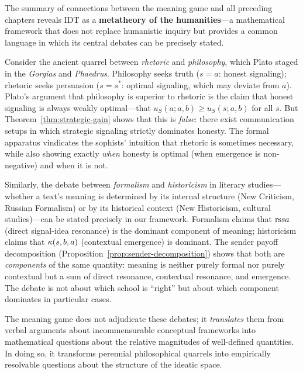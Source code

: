 \begin{interpretation}
\label{interp:ch14:summary_metatheory}
The summary of connections between the meaning game and all preceding
chapters reveals IDT as a \textbf{metatheory of the humanities}---a
mathematical framework that does not replace humanistic inquiry but provides
a common language in which its central debates can be precisely stated.

Consider the ancient quarrel between \emph{rhetoric} and \emph{philosophy},
which Plato staged in the \emph{Gorgias} and \emph{Phaedrus}.  Philosophy
seeks truth ($s = a$: honest signaling); rhetoric seeks persuasion
($s = s^*$: optimal signaling, which may deviate from $a$).  Plato's
argument that philosophy is superior to rhetoric is the claim that honest
signaling is always weakly optimal---that $u_S(a; a, b) \geq u_S(s; a, b)$
for all $s$.  But Theorem~\ref{thm:strategic-gain} shows that this is
\emph{false}: there exist communication setups in which strategic signaling
strictly dominates honesty.  The formal apparatus vindicates the sophists'
intuition that rhetoric is sometimes necessary, while also showing exactly
\emph{when} honesty is optimal (when emergence is non-negative) and when it
is not.

Similarly, the debate between \emph{formalism} and \emph{historicism} in
literary studies---whether a text's meaning is determined by its internal
structure (New Criticism, Russian Formalism) or by its historical context
(New Historicism, cultural studies)---can be stated precisely in our
framework.  Formalism claims that $\mathrm{rs}{s}{a}$ (direct signal-idea resonance)
is the dominant component of meaning; historicism claims that $\kappa(s, b, a)$
(contextual emergence) is dominant.  The sender payoff decomposition
(Proposition~\ref{prop:sender-decomposition}) shows that both are
\emph{components} of the same quantity: meaning is neither purely formal
nor purely contextual but a sum of direct resonance, contextual resonance,
and emergence.  The debate is not about which school is ``right'' but about
which component dominates in particular cases.

The meaning game does not adjudicate these debates; it \emph{translates}
them from verbal arguments about incommensurable conceptual frameworks into
mathematical questions about the relative magnitudes of well-defined
quantities.  In doing so, it transforms perennial philosophical quarrels
into empirically resolvable questions about the structure of the ideatic
space.
\end{interpretation}





